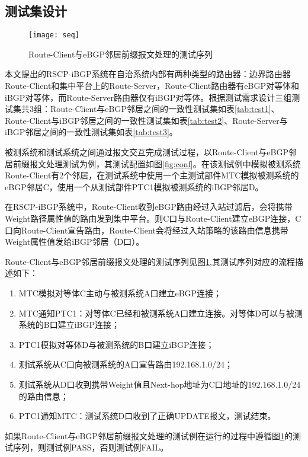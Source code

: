 \subsection{测试集设计}

\begin{figure}
  \centering
  \texttt{[image: seq]}
  \caption{Route-Client与eBGP邻居前缀报文处理的测试序列}
  \label{fig:seq}
\end{figure}

本文提出的RSCP-iBGP系统在自治系统内部有两种类型的路由器：边界路由器Route-Client和集中平台上的Route-Server，Route-Client路由器有eBGP对等体和iBGP对等体，而Route-Server路由器仅有iBGP对等体。根据测试需求设计三组测试集共3组：Route-Client与eBGP邻居之间的一致性测试集如表\ref{tab:test1}、Route-Client与iBGP邻居之间的一致性测试集如表\ref{tab:test2}、Route-Server与iBGP邻居之间的一致性测试集如表\ref{tab:test3}。

被测系统和测试系统之间通过报文交互完成测试过程，以Route-Client与eBGP邻居前缀报文处理测试为例，其测试配置如图\ref{fig:conf}。在该测试例中模拟被测系统Route-Client有2个邻居，在测试系统中使用一个主测试部件MTC模拟被测系统的eBGP邻居C，使用一个从测试部件PTC1模拟被测系统的iBGP邻居D。

在RSCP-iBGP系统中，Route-Client收到eBGP路由经过入站过滤后，会将携带Weight路径属性值的路由发到集中平台。则C口与Route-Client建立eBGP连接，C口向Route-Client宣告路由，Route-Client会将经过入站策略的该路由信息携带Weight属性值发给iBGP邻居（D口）。



Route-Client与eBGP邻居前缀报文处理的测试序列见图\ref{fig:seq},其测试序列对应的流程描述如下：

\begin{enumerate}[1)]
  \item MTC模拟对等体C主动与被测系统A口建立eBGP连接；
  \item MTC通知PTC1：对等体C已经和被测系统A口建立连接。对等体D可以与被测系统的B口建立iBGP连接；
  \item PTC1模拟对等体D与被测系统的B口建立iBGP连接；
  \item 测试系统从C口向被测系统的A口宣告路由192.168.1.0/24；
  \item 测试系统从D口收到携带Weight值且Next-hop地址为C口地址的192.168.1.0/24的路由信息；
  \item PTC1通知MTC：测试系统D口收到了正确UPDATE报文，测试结束。
\end{enumerate}

如果Route-Client与eBGP邻居前缀报文处理的测试例在运行的过程中遵循图\ref{fig:seq}的测试序列，则测试例PASS，否则测试例FAIL。



